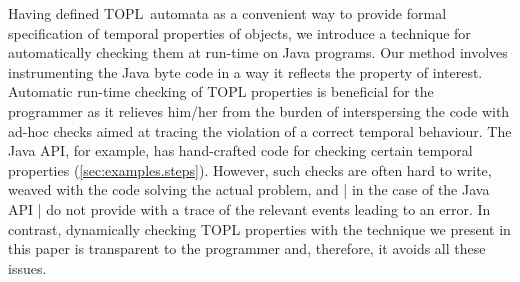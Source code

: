 \documentclass{llncs} %
\newcommand{\TPL}{TOPL}
\begin{document}
%


Having defined \TPL \ automata as a convenient way to provide formal specification of temporal properties
of objects,  we introduce a technique for automatically checking them at run-time on Java programs.
Our method involves instrumenting the Java byte code in a way it reflects the property of interest.
Automatic run-time checking of TOPL properties is beneficial for the programmer as
 it relieves him/her from the burden of 
interspersing the code with ad-hoc checks  aimed at tracing the violation of a correct temporal behaviour.
The Java API, for example, has hand-crafted code for checking certain temporal properties (\autoref{sec:examples.steps}).
However, such checks are often hard to write, weaved with the code solving the actual problem, and | in the case of the Java API |  do not provide with a trace of the relevant events leading to an error.
In contrast, dynamically checking TOPL properties  with the technique we present in this paper is transparent to the programmer and, therefore,  it avoids all these issues.
\end{document}
